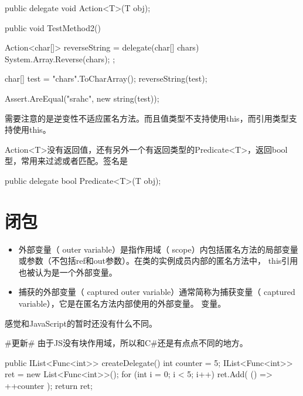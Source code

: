 \begin{CSharp}
		public delegate void Action<T>(T obj);
\end{CSharp}


\begin{CSharp}[Action和匿名方法]
        [TestMethod]
        public void TestMethod2()
        {
            Action<char[]> reverseString = delegate(char[] chars){
                System.Array.Reverse(chars);
            };

            char[] test = "chars".ToCharArray();
            reverseString(test);

            Assert.AreEqual("srahc", new string(test));

        }
\end{CSharp}

需要注意的是逆变性不适应匿名方法。而且值类型不支持使用this，而引用类型支持使用this。


Action<T>没有返回值，还有另外一个有返回类型的Predicate<T>，返回bool型，常用来过滤或者匹配。签名是
\begin{CSharp}
		public delegate bool Predicate<T>(T obj);
\end{CSharp}

\section{闭包}
\begin{itemize}
\item 外部变量（ outer variable）是指作用域（ scope）内包括匿名方法的局部变量或参数（不包括ref和out参数）。在类的实例成员内部的匿名方法中， this引用也被认为是一个外部变量。
\item 捕获的外部变量（ captured outer variable）通常简称为捕获变量（ captured variable），它是在匿名方法内部使用的外部变量。
变量。
\end{itemize}

感觉和JavaScript的暂时还没有什么不同。


\#更新\#
由于JS没有块作用域，所以和C\#还是有点点不同的地方。

\begin{CSharp}
        public IList<Func<int>> createDelegate()
        {
            int counter = 5;
            IList<Func<int>> ret = new List<Func<int>>();
            for (int i = 0; i < 5; i++)
            {
                ret.Add( () => ++counter );
            }
            return ret; 
        }
\end{CSharp}

